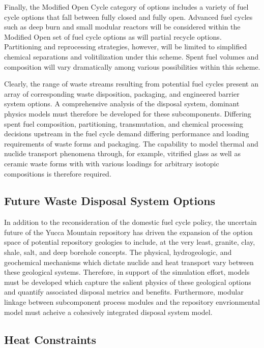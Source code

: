 Finally, the Modified Open Cycle category of options includes a 
variety of fuel cycle options that fall between fully closed and fully 
open. Advanced fuel cycles such as deep burn and small modular 
reactors will be considered within the Modified Open set of fuel cycle 
options as will partial recycle options. Partitioning and reprocessing 
strategies, however, will be limited to simplified chemical 
separations and volitilization under this scheme. Spent fuel volumes 
and composition will vary dramatically among various possibilities 
within this scheme.  

Clearly, the range of waste streams resulting from potential fuel 
cycles present an array of corresponding waste disposition, packaging, 
and engineered barrier system options. A comprehensive analysis of the 
disposal system, dominant physics models must therefore be developed 
for these subcomponents.  Differing spent fuel composition, 
partitioning, transmutation, and chemical processing decisions 
upstream in the fuel cycle demand differing performance and loading 
requirements of waste forms and packaging. The capability to model 
thermal and nuclide transport phenomena through, for example, 
vitrified glass as well as ceramic waste forms with with various 
loadings for arbitrary isotopic compositions is therefore required.  

\subsection{Future Waste Disposal System Options}

In addition to the reconsideration of the domestic fuel cycle policy, 
the uncertain future of the Yucca Mountain repository has driven the 
expansion of the option space of potential repository geologies to 
include, at the very least, granite, clay, shale, salt, and deep 
borehole concepts. The
physical, hydrogeologic, and geochemical mechanisms which dictate 
nuclide and heat transport vary between these geological systems. 
Therefore, in support of the simulation effort, models must be 
developed which capture the salient physics of these geological 
options and quantify associated disposal metrics and benefits.  
Furthermore, modular linkage between subcomponent process modules and 
the repository envrionmental model must acheive a cohesively 
integrated disposal system model.  

\subsection{Heat Constraints}

